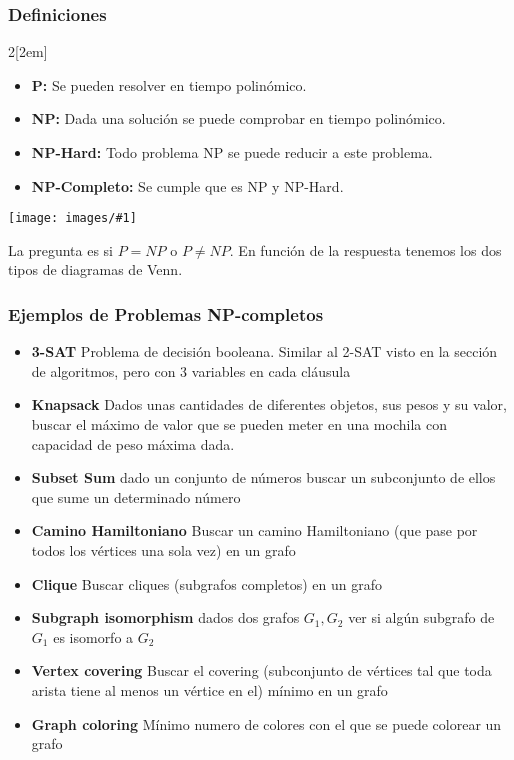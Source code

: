 \documentclass{myclass}
\newcommand{\incimg}[1]{%
\texttt{[image: images/\#1]}
}
\begin{document}
\subsubsection{Definiciones}
\begin{multicols}{2}[\columnsep2em]
\begin{itemize}
  \item \textbf{P:} Se pueden resolver en tiempo polinómico.
  \item \textbf{NP:} Dada una solución se puede comprobar en tiempo polinómico.
  \item \textbf{NP-Hard:} Todo problema NP se puede reducir a este problema.
  \item \textbf{NP-Completo:} Se cumple que es NP y NP-Hard.
\end{itemize}
\columnbreak
\incimg{PNP.png}
\end{multicols}
\noindent
La pregunta es si $P=NP$ o  $P\neq NP$. En función de la respuesta tenemos los dos tipos de diagramas de Venn.

\subsubsection{Ejemplos de Problemas NP-completos}
\begin{itemize}
  \item \textbf{3-SAT} Problema de decisión booleana. Similar al 2-SAT visto en la sección de algoritmos, pero con 3 variables en cada cláusula
  \item \textbf{Knapsack} Dados unas cantidades de diferentes objetos, sus pesos y su valor, buscar el máximo de valor que se pueden meter en una mochila con capacidad de peso máxima dada.
  \item \textbf{Subset Sum} dado un conjunto de números buscar un subconjunto de ellos que sume un determinado número
  \item \textbf{Camino Hamiltoniano} Buscar un camino Hamiltoniano (que pase por todos los vértices una sola vez) en un grafo
  \item \textbf{Clique} Buscar cliques (subgrafos completos) en un grafo
  \item \textbf{Subgraph isomorphism} dados dos grafos $G_1, G_2$ ver si algún subgrafo de $G_1$ es isomorfo a $G_2$
  \item \textbf{Vertex covering} Buscar el covering (subconjunto de vértices tal que toda arista tiene al menos un vértice en el) mínimo en un grafo
  \item \textbf{Graph coloring} Mínimo numero de colores con el que se puede colorear un grafo
\end{itemize}
\end{document}
